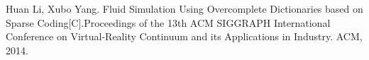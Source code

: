 
\begin{publications}{99}

    \item{Huan Li, Xubo Yang}.
     {Fluid Simulation Using Overcomplete Dictionaries based on Sparse Coding}[C].Proceedings of the 13th ACM SIGGRAPH International Conference on Virtual-Reality Continuum and its Applications in Industry. ACM, 2014.
    
\end{publications}
